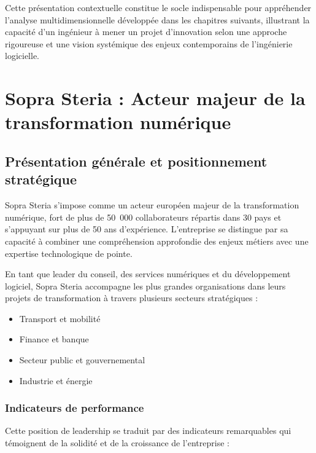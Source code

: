 Cette présentation contextuelle constitue le socle indispensable pour appréhender l'analyse multidimensionnelle développée dans les chapitres suivants, illustrant la capacité d'un ingénieur à mener un projet d'innovation selon une approche rigoureuse et une vision systémique des enjeux contemporains de l'ingénierie logicielle.

\section{Sopra Steria : Acteur majeur de la transformation numérique}

\subsection{Présentation générale et positionnement stratégique}

Sopra Steria s'impose comme un acteur européen majeur de la transformation numérique, fort de plus de 50~000 collaborateurs répartis dans 30 pays et s'appuyant sur plus de 50 ans d'expérience. L'entreprise se distingue par sa capacité à combiner une compréhension approfondie des enjeux métiers avec une expertise technologique de pointe.

En tant que leader du conseil, des services numériques et du développement logiciel, Sopra Steria accompagne les plus grandes organisations dans leurs projets de transformation à travers plusieurs secteurs stratégiques :
\begin{itemize}
    \item Transport et mobilité
    \item Finance et banque  
    \item Secteur public et gouvernemental
    \item Industrie et énergie
\end{itemize}

\subsubsection{Indicateurs de performance}

Cette position de leadership se traduit par des indicateurs remarquables qui témoignent de la solidité et de la croissance de l'entreprise :

